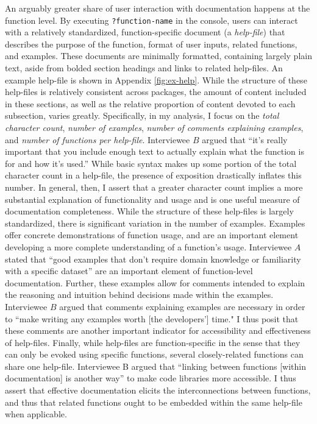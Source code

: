 An arguably greater share of user interaction with documentation happens at the function level. By executing \texttt{?function-name} in the console, users can interact with a relatively standardized, function-specific document (a \textit{help-file}) that describes the purpose of the function, format of user inputs, related functions, and examples. These documents are minimally formatted, containing largely plain text, aside from bolded section headings and links to related help-files. An example help-file is shown in Appendix \ref{fig:ex-help}. While the structure of these help-files is relatively consistent across packages, the amount of content included in these sections, as well as the relative proportion of content devoted to each subsection, varies greatly. Specifically, in my analysis, I focus on the \textit{total character count}, \textit{number of examples}, \textit{number of comments explaining examples}, and \textit{number of functions per help-file}. Interviewee $B$ argued that ``it's really important that you include enough text to actually explain what the function is for and how it's used.'' While basic syntax makes up some portion of the total character count in a help-file, the presence of exposition drastically inflates this number. In general, then, I assert that a greater character count implies a more substantial explanation of functionality and usage and is one useful measure of documentation completeness. While the structure of these help-files is largely standardized, there is significant variation in the number of examples. Examples offer concrete demonstrations of function usage, and are an important element developing a more complete understanding of a function's usage. Interviewee $A$ stated that ``good examples that don’t require domain knowledge or familiarity with a specific dataset'' are an important element of function-level documentation. Further, these examples allow for comments intended to explain the reasoning and intuition behind decisions made within the examples. Interviewee $B$ argued that comments explaining examples are necessary in order to ``make writing any examples worth [the developers'] time." I thus posit that these comments are another important indicator for accessibility and effectiveness of help-files. Finally, while help-files are function-specific in the sense that they can only be evoked using specific functions, several closely-related functions can share one help-file. Interviewee B argued that ``linking between functions [within documentation] is another way'' to make code libraries more accessible. I thus assert that effective documentation elicits the interconnections between functions, and thus that related functions ought to be embedded within the same help-file when applicable.

